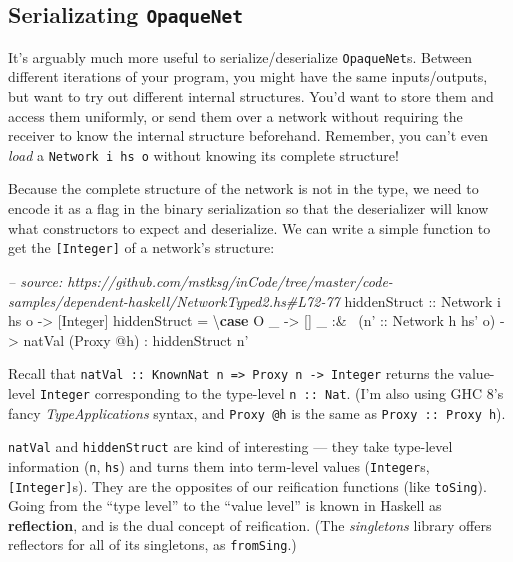 \documentclass[]{article}
\newenvironment{Shaded}{\begin{snugshade}}{\end{snugshade}}
\newcommand{\CommentTok}[1]{\textcolor[rgb]{0.56,0.35,0.01}{\textit{#1}}}
\newcommand{\DataTypeTok}[1]{\textcolor[rgb]{0.13,0.29,0.53}{#1}}
\newcommand{\FunctionTok}[1]{\textcolor[rgb]{0.00,0.00,0.00}{#1}}
\newcommand{\KeywordTok}[1]{\textcolor[rgb]{0.13,0.29,0.53}{\textbf{#1}}}
\newcommand{\NormalTok}[1]{#1}
\newcommand{\OtherTok}[1]{\textcolor[rgb]{0.56,0.35,0.01}{#1}}
\begin{document}
\hypertarget{serializating-opaquenet}{%
\subsection{\texorpdfstring{Serializating
\texttt{OpaqueNet}}{Serializating OpaqueNet}}\label{serializating-opaquenet}}

It's arguably much more useful to serialize/deserialize \texttt{OpaqueNet}s.
Between different iterations of your program, you might have the same
inputs/outputs, but want to try out different internal structures. You'd want to
store them and access them uniformly, or send them over a network without
requiring the receiver to know the internal structure beforehand. Remember, you
can't even \emph{load} a \texttt{Network\ i\ hs\ o} without knowing its complete
structure!

Because the complete structure of the network is not in the type, we need to
encode it as a flag in the binary serialization so that the deserializer will
know what constructors to expect and deserialize. We can write a simple function
to get the \texttt{{[}Integer{]}} of a network's structure:

\begin{Shaded}
\begin{Highlighting}[]
\CommentTok{-- source: https://github.com/mstksg/inCode/tree/master/code-samples/dependent-haskell/NetworkTyped2.hs#L72-77}
\OtherTok{hiddenStruct ::} \DataTypeTok{Network}\NormalTok{ i hs o }\OtherTok{->}\NormalTok{ [}\DataTypeTok{Integer}\NormalTok{]}
\NormalTok{hiddenStruct }\FunctionTok{=}\NormalTok{ \textbackslash{}}\KeywordTok{case}
    \DataTypeTok{O}\NormalTok{ _    }\OtherTok{->}\NormalTok{ []}
\NormalTok{    _ }\FunctionTok{:&~}\NormalTok{ (}\OtherTok{n' ::} \DataTypeTok{Network}\NormalTok{ h hs' o)}
           \OtherTok{->}\NormalTok{ natVal (}\DataTypeTok{Proxy} \FunctionTok{@}\NormalTok{h)}
            \FunctionTok{:}\NormalTok{ hiddenStruct n'}
\end{Highlighting}
\end{Shaded}

Recall that
\texttt{natVal\ ::\ KnownNat\ n\ =\textgreater{}\ Proxy\ n\ -\textgreater{}\ Integer}
returns the value-level \texttt{Integer} corresponding to the type-level
\texttt{n\ ::\ Nat}. (I'm also using GHC 8's fancy \emph{TypeApplications}
syntax, and \texttt{Proxy\ @h} is the same as \texttt{Proxy\ ::\ Proxy\ h}).

\texttt{natVal} and \texttt{hiddenStruct} are kind of interesting --- they take
type-level information (\texttt{n}, \texttt{hs}) and turns them into term-level
values (\texttt{Integer}s, \texttt{{[}Integer{]}}s). They are the opposites of
our reification functions (like \texttt{toSing}). Going from the ``type level''
to the ``value level'' is known in Haskell as \textbf{reflection}, and is the
dual concept of reification. (The \emph{singletons} library offers reflectors
for all of its singletons, as \texttt{fromSing}.)
\end{document}
